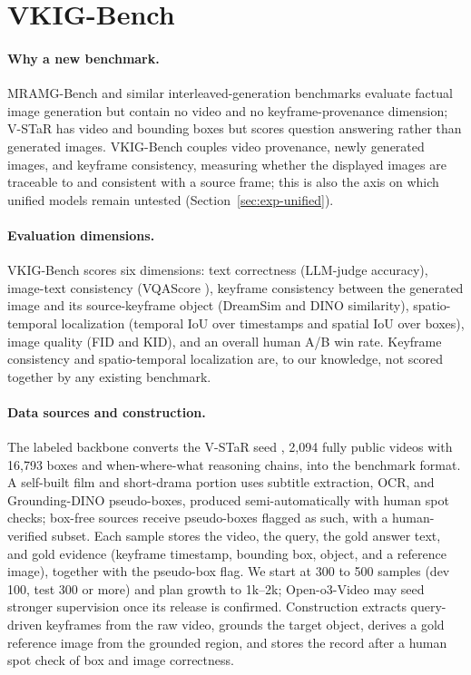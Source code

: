 \documentclass[10pt]{article}
\begin{document}
\section{VKIG-Bench}\label{sec:bench}

\paragraph{Why a new benchmark.}
MRAMG-Bench \citep{mramgbench2502} and similar interleaved-generation benchmarks evaluate factual image generation but contain no video and no keyframe-provenance dimension; V-STaR \citep{vstar2503} has video and bounding boxes but scores question answering rather than generated images. VKIG-Bench couples video provenance, newly generated images, and keyframe consistency, measuring whether the displayed images are traceable to and consistent with a source frame; this is also the axis on which unified models \citep{bagel2505,showo22506} remain untested (Section~\ref{sec:exp-unified}).

\paragraph{Evaluation dimensions.}
VKIG-Bench scores six dimensions: text correctness (LLM-judge accuracy), image-text consistency (VQAScore \citep{vqascore}), keyframe consistency between the generated image and its source-keyframe object (DreamSim and DINO similarity), spatio-temporal localization (temporal IoU over timestamps and spatial IoU over boxes), image quality (FID and KID), and an overall human A/B win rate. Keyframe consistency and spatio-temporal localization are, to our knowledge, not scored together by any existing benchmark.

\paragraph{Data sources and construction.}
The labeled backbone converts the V-STaR seed \citep{vstar2503}, 2{,}094 fully public videos with 16{,}793 boxes and when-where-what reasoning chains, into the benchmark format. A self-built film and short-drama portion uses subtitle extraction, OCR, and Grounding-DINO pseudo-boxes, produced semi-automatically with human spot checks; box-free sources receive pseudo-boxes flagged as such, with a human-verified subset. Each sample stores the video, the query, the gold answer text, and gold evidence (keyframe timestamp, bounding box, object, and a reference image), together with the pseudo-box flag. We start at 300 to 500 samples (dev 100, test 300 or more) and plan growth to 1k--2k; Open-o3-Video \citep{openo3video2510} may seed stronger supervision once its release is confirmed. Construction extracts query-driven keyframes from the raw video, grounds the target object, derives a gold reference image from the grounded region, and stores the record after a human spot check of box and image correctness.
\end{document}
